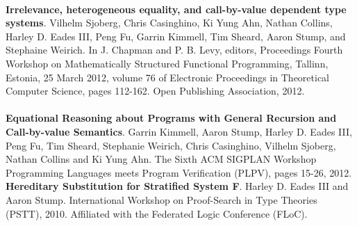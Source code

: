 \documentclass[line,margin]{res}
\begin{document}
\begin{resume}
                  \ \\
                  \textbf{Irrelevance, heterogeneous equality, and call-by-value dependent type systems}.
		  Vilhelm Sjoberg, Chris Casinghino, Ki Yung Ahn, Nathan Collins, Harley D. Eades III, Peng Fu, Garrin Kimmell, Tim Sheard, Aaron Stump, and Stephaine Weirich.
		  In J. Chapman and P. B. Levy, editors, Proceedings Fourth Workshop on Mathematically Structured Functional Programming, Tallinn, 
		  Estonia, 25 March 2012, volume 76 of Electronic Proceedings in Theoretical Computer Science, pages 112-162. Open Publishing Association, 2012.\\
                  \ \\
                  \textbf{Equational Reasoning about Programs with General Recursion and Call-by-value Semantics}.
                  Garrin Kimmell, Aaron Stump, Harley D. Eades III, Peng Fu, Tim Sheard, Stephanie Weirich, 
                  Chris Casinghino, Vilhelm Sjoberg, Nathan Collins and Ki Yung Ahn. 
                  The Sixth ACM SIGPLAN Workshop Programming Languages meets Program Verification (PLPV), pages 15-26, 2012. \\
                  
                  \newpage
                  \textbf{Hereditary Substitution for Stratified System F}. Harley D. Eades III and Aaron Stump. 
                  International Workshop on Proof-Search in Type Theories (PSTT), 2010. Affiliated with 
                  the Federated Logic Conference (FLoC).\\                  


\end{resume}
\end{document}
